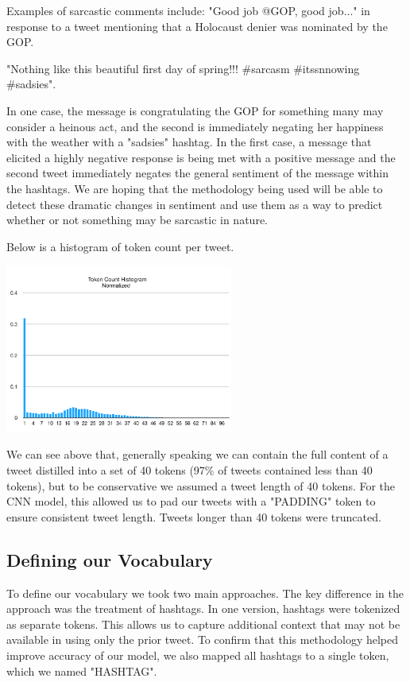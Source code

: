 \documentclass[11pt,a4paper]{article}
\begin{document}
Examples of sarcastic comments include:
 "Good job @GOP, good job..." in response to a tweet mentioning that a Holocaust denier was nominated by the GOP.   
 
 "Nothing like this beautiful first day of spring!!! \#sarcasm \#itssnnowing \#sadsies". 
 
 In one case, the message is congratulating the GOP for something many may consider a heinous act, and the second is immediately negating her happiness with the weather with a "sadsies" hashtag. In the first case, a message that elicited a highly negative response is being met with a positive message and the second tweet immediately negates the general sentiment of the message within the hashtags. We are hoping that the methodology being used will be able to detect these dramatic changes in sentiment and use them as a way to predict whether or not something may be sarcastic in nature.

Below is a histogram of token count per tweet.

\includegraphics[width=75mm,scale=0.5]{tokenhistogram.png}

We can see above that, generally speaking we can contain the full content of a tweet distilled into a set of 40 tokens (97\% of tweets contained less than 40 tokens), but to be conservative we assumed a tweet length of 40 tokens. For the CNN model, this allowed us to pad our tweets with a "PADDING" token to ensure consistent tweet length. Tweets longer than 40 tokens were truncated.

\subsection{Defining our Vocabulary}

To define our vocabulary we took two main approaches. The key difference in the approach was the treatment of hashtags. In one version, hashtags were tokenized as separate tokens. This allows us to capture additional context that may not be available in using only the prior tweet. To confirm that this methodology helped improve accuracy of our model, we also mapped all hashtags to a single token, which we named "HASHTAG". 
\end{document}
